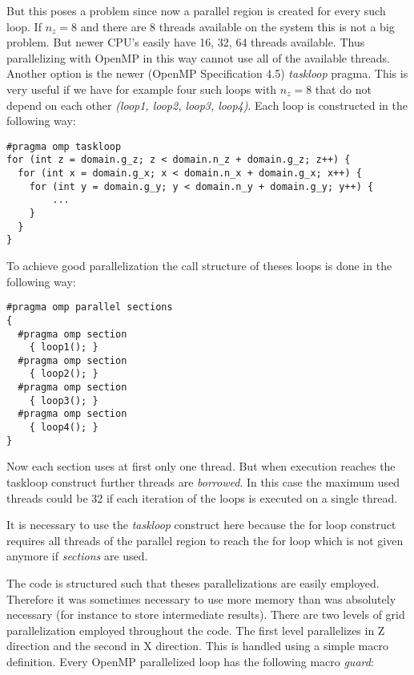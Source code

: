 \documentclass[master.tex]{subfiles}
\begin{document}
But this poses a problem since now a parallel region is created for every such loop. If $n_z=8$ and there are 8 threads available on the system this is not a big problem. But newer CPU's easily have 16, 32, 64 threads available. Thus parallelizing with OpenMP in this way cannot use all of the available threads. Another option is the newer (OpenMP Specification 4.5) \textit{taskloop} pragma. This is very useful if we have for example four such loops with $n_z=8$ that do not depend on each other \textit{(loop1, loop2, loop3, loop4)}. Each loop is constructed in the following way:
\begin{lstlisting}
#pragma omp taskloop
for (int z = domain.g_z; z < domain.n_z + domain.g_z; z++) {
  for (int x = domain.g_x; x < domain.n_x + domain.g_x; x++) {
    for (int y = domain.g_y; y < domain.n_y + domain.g_y; y++) {
        ...
    }
  }
}
\end{lstlisting}


To achieve good parallelization the call structure of theses loops is done in the following way:
\begin{lstlisting}
#pragma omp parallel sections
{
  #pragma omp section 
    { loop1(); }
  #pragma omp section
    { loop2(); }
  #pragma omp section
    { loop3(); }
  #pragma omp section
    { loop4(); }
}
\end{lstlisting}
Now each section uses at first only one thread. But when execution reaches the taskloop construct further threads are \textit{borrowed}. In this case the maximum used threads could be 32 if each iteration of the loops is executed on a single thread.\newline

\begin{blockquote}
  \small
  It is necessary to use the \textit{taskloop} construct here because the for loop construct requires all threads of the parallel region to reach the for loop which is not given anymore if \textit{sections} are used.
\end{blockquote}

The code is structured such that theses parallelizations are easily employed. Therefore it was sometimes necessary to use more memory than was absolutely necessary (for instance to store intermediate results).\newline
There are two levels of grid parallelization employed throughout the code. The first level parallelizes in Z direction and the second in X direction. This is handled using a simple macro definition. Every OpenMP parallelized loop has the following macro \textit{guard}:
\end{document}
